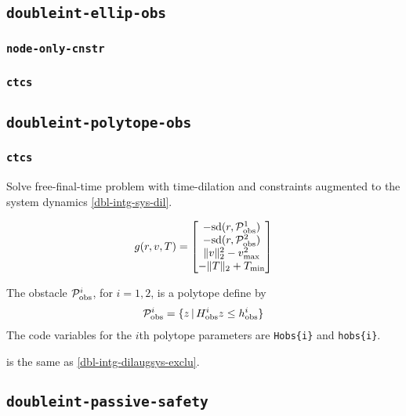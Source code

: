 \documentclass[11pt,a4paper]{article}
\begin{document}
\subsection{\texttt{doubleint-ellip-obs}}

\subsubsection{\texttt{node-only-cnstr}}

\subsubsection{\texttt{ctcs}}

\subsection{\texttt{doubleint-polytope-obs}}

\subsubsection{\texttt{ctcs}}

Solve free-final-time problem with time-dilation and constraints augmented to the system dynamics \eqref{dbl-intg-sys-dil}.

\begin{align*}
    g(r,v,T) = \begin{bmatrix}
                  -\mathrm{sd}(r,\mathcal{P}^1_{\mathrm{obs}})\\
                  -\mathrm{sd}(r,\mathcal{P}^2_{\mathrm{obs}})\\
                  \|v\|_2^2 - v_{\max}^2\\
                  -\|T\|_2 + T_{\min}
               \end{bmatrix}
\end{align*}

The obstacle $\mathcal{P}^i_{\mathrm{obs}}$, for $i=1,2$, is a polytope define by
\begin{align*}
    \mathcal{P}^i_{\mathrm{obs}} = \{z\,|\,H^i_{\mathrm{obs}}z \le h^i_{\text{obs}}\}
\end{align*}
The code variables for the $i$th polytope parameters are \verb|Hobs{i}| and \verb|hobs{i}|.

 is the same as \eqref{dbl-intg-dilaugsys-exclu}.

\subsection{\texttt{doubleint-passive-safety}}
\end{document}
